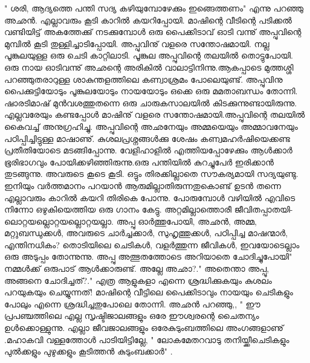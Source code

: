 " ശരി, ആദ്യത്തെ പന്തി സദ്യ കഴിയുമ്പോഴേക്കും ഇങ്ങെത്തണം" എന്നു പറഞ്ഞു അഛൻ. എല്ലാവരും കൂടി കാറിൽ കയറിപ്പോയി.
    മാഷിന്റെ വീടിന്റെ പടിക്കൽ വണ്ടിയിട്ട് അകത്തേക്കു് നടക്കുമ്പോൾ ഒരു പൈക്കിടാവ് ഓടി വന്നു് അപ്പുവിന്റെ മുമ്പിൽ  കൂടി തുള്ളിച്ചാടിപ്പോയി. അപ്പുവിനു് വളരെ സന്തോഷമായി. നല്ല പൂങ്കുലയുള്ള ഒരു ചെടി കാറ്റിലാടി. പൂങ്കുല അപ്പുവിന്റെ തലയിൽ തൊട്ടുപോയി. ഒരു നായ ഓടിവന്നു് അഛന്റെ അരികിൽ വാലാട്ടിനിന്നു.ആകപ്പാടെ മുത്തശ്ശി പറഞ്ഞുതരാറുള്ള ശാകുന്തളത്തിലെ കണ്വാശ്രമം പോലെയുണ്ട്. അപ്പുവിനു പൈക്കുട്ടിയോടും പൂങ്കുലയോടും നായയോടും ഒക്കെ ഒരു മമതാബന്ധം തോന്നി.
   ഷാരടിമാഷ് മുൻ‌വശത്തുതന്നെ ഒരു ചാരുകസാലയിൽ കിടക്കുന്നുണ്ടായിരുന്നു. എല്ലവരേയും കണ്ടപ്പോൾ മാഷിനു് വളരെ സന്തോഷമായി.അപ്പുവിന്റെ തലയിൽ കൈവച്ച് അനുഗ്രഹിച്ചു. അപ്പുവിന്റെ അഛനേയും അമ്മയെയും അമ്മാവനേയും പഠിപ്പിച്ചിട്ടുള്ള മാഷാണു്. കുശലപ്രശ്നങ്ങൾക്കു ശേഷം കണ്വമഹർഷിയെക്കണ്ട പ്രതീതിയോടെ മടങ്ങിപ്പോന്നു.
       വേളിഹാളിൽ എത്തിയപ്പോഴേക്കും ആൾക്കാർ ഭൂരിഭാഗവും പോയിക്കഴിഞ്ഞിരുന്നു.ഒരു പന്തിയിൽ കുറച്ചുപേർ ഇരിക്കാൻ തുടങ്ങുന്നു. അവരുടെ കൂടെ കൂടി. ഒട്ടും തിരക്കില്ലാതെ സൗകര്യമായി സദ്യയുണ്ടു. ഇനിയും വർത്തമാനം പറയാൻ ആരുമില്ലാതിരുന്നതുകൊണ്ട് ഉടൻ തന്നെ എല്ലാവരും കാറിൽ കയറി തിരികെ പോന്നു. പോരുമ്പോൾ വഴിയിൽ എവിടെ നിന്നോ ഒഴുകിയെത്തിയ ഒരു ഗാനം കേട്ടു.
അറ്റമില്ലാത്തൊരീ ജീവിതപ്പാതയി-
ലൊറ്റയല്ലൊറ്റയല്ലൊറ്റയല്ലാ.
അപ്പു ഓർത്തുപോയി, അഛൻ, അമ്മ, മറ്റുബന്ധുക്കൾ, അവരുടെ ചാർച്ചക്കാർ, സുഹൃത്തുക്കൾ, പഠിപ്പിച്ച മാഷന്മാർ, എന്തിനധികം? തൊടിയിലെ ചെടികൾ, വളർത്തുന്ന ജീവികൾ, ഇവയോടെല്ലാം ഒരു അടുപ്പം തോന്നുന്നു.
അപ്പു അത്ഭുതത്തോടെ അറിയാതെ ചോദിച്ചുപോയി" നമ്മൾക്ക് ഒരുപാട് ആൾക്കാരുണ്ട്. അല്ലേ അഛാ?." 
അതെന്താ അപ്പൂ, അങ്ങനെ ചോദിച്ചത്?." 
എത്ര ആളുകളാ എന്നെ ശ്രദ്ധിക്കുകയും കുശലം പറയുകയും ചെയ്യുന്നത്! മാഷിന്റെ വീട്ടിലെ പൈക്കിടാവും നായയും ചെടികളും പോലും എന്നെ ശ്രദ്ധിച്ചതുപോലെ തോന്നി.
അഛൻ പറഞ്ഞു,, " ഈ പ്രപഞ്ചത്തിലെ എല്ല സൃഷ്ടിജാലങ്ങളും ഒരേ ഈശ്വരന്റെ ചൈതന്യം ഉൾക്കൊള്ളുന്നു. എല്ലാ ജീവജാലങ്ങളും ഒരേകുടുംബത്തിലെ അംഗങ്ങളാണു് .മഹാകവി വള്ളത്തോൾ പാടിയിട്ടില്ലേ,
  " ലോകമേതറവാടു തനിയ്ക്കീചെടികളും പുൽക്കളും പുഴുക്കളും കൂടിത്തൻ കുടുംബക്കാർ" .

